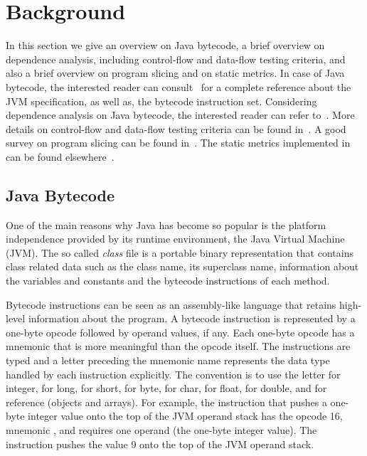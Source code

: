 
\section{Background}\label{sec:background}

In this section we give an overview on Java bytecode, a brief
overview on dependence analysis, including control-flow and
data-flow testing criteria, and also a brief overview on program
slicing and on static metrics. In case of Java bytecode, the
interested reader can consult~\cite{Lindholm99JVMS} for a complete
reference about the JVM specification, as well as, the bytecode
instruction set. Considering dependence analysis on Java bytecode,
the interested reader can refer to~\cite{Zhao00DAJB}. More details
on control-flow and data-flow testing criteria can be found
in~\cite{Rapps85SSTD,Sinha99CTEH}. A good survey on program
slicing can be found in~\cite{Tip95SPST}. The static metrics
implemented in \toolname can be found
elsewhere~\cite{Lorenz94OOSM,Chidamber94MSOO}.

\subsection{Java Bytecode}\label{sec-bytecode}

One of the main reasons why Java has become so popular is the
platform independence provided by its runtime environment, the
Java Virtual Machine (JVM). The so called \emph{class} file is a
portable binary representation that contains class related data
such as the class name, its superclass name, information about the
variables and constants and the bytecode instructions of each
method.

Bytecode instructions can be seen as an assembly-like language
that retains high-level information about the program. A bytecode
instruction is represented by a one-byte opcode followed by
operand values, if any. Each one-byte opcode has a mnemonic that
is more meaningful than the opcode itself. The instructions are
typed and a letter preceding the mnemonic name represents the data
type handled by each instruction explicitly. The convention is to
use the letter  for integer,  for long,  for
short,  for byte,  for char,  for float,
 for double, and  for reference (objects and
arrays). For example, the instruction that pushes a one-byte
integer value onto the top of the JVM operand stack has the opcode
16, mnemonic , and requires one operand (the one-byte
integer value). The instruction  pushes the value 9
onto the top of the JVM operand stack.

